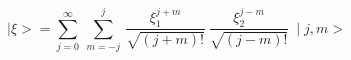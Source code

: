 \begin{equation}
\mid \xi>= \sum_{j=0}^\infty~\sum_{m=-j}^j ~\frac{\xi_1^{j+m}}{\sqrt{(j+m)!}}~\frac{\xi_2^{j-m}}{\sqrt{(j-m)!}}~\mid j,m>   
\end{equation}

